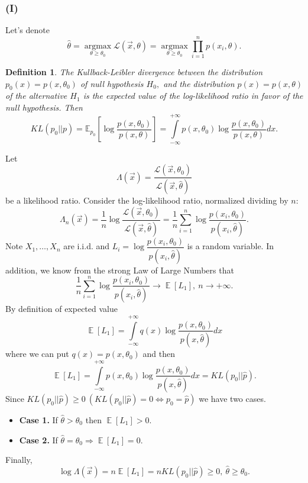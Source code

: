 \documentclass[a4paper, 12pt]{article}
\DeclareMathOperator*{\E}{\mathbb{E}}
\DeclareMathOperator*{\argmax}{\text{argmax}}
\newtheorem{definition}{Definition}
\begin{document}
\subsubsection{(I)}
Let's denote
$$
\hat{\theta} = \argmax \limits_{\theta \geqslant \theta_0} \mathcal{L}(\vec{x}, \theta) = \argmax \limits_{\theta \geqslant \theta_0} \prod \limits_{i=1}^n p(x_i, \theta).
$$
\begin{definition}
The Kullback-Leibler divergence between the  distribution $p_0(x) = p(x, \theta_0)$ of null hypothesis $H_0,$ and the distribution $p(x) = p(x, \theta)$ of the alternative $H_1$ is the expected value of the log-likelihood ratio in favor of the null hypothesis. Then
$$
KL(p_0 || p) = \mathbb{E}_{p_0} \left[ \log \dfrac{p(x, \theta_0)}{p(x, \theta)} \right] = \int \limits_{-\infty}^{+\infty} p(x, \theta_0) \log \dfrac{p(x, \theta_0)}{p(x, \theta)} dx.
$$
\end{definition}
\noindent Let 
\begin{equation}
\label{lab1}
\Lambda(\vec{x}) = \dfrac{\mathcal{L}(\vec{x}, \theta_0)}{\mathcal{L}(\vec{x}, \hat{\theta})}
\end{equation}
be a likelihood ratio.
Consider the log-likelihood ratio, normalized dividing by $n:$
$$
\Lambda_n(\vec{x}) = \dfrac{1}{n} \log \dfrac{\mathcal{L}(\vec{x}, \theta_0)}{\mathcal{L}(\vec{x}, \hat{\theta})} = \dfrac{1}{n} \sum \limits_{i=1}^n \log \dfrac{p(x_i, \theta_0)}{p(x_i, \hat{\theta})}.
$$
Note $X_1, \ldots, X_n$ are i.i.d. and $L_i = \log \dfrac{p(x_i, \theta_0)}{p(x_i, \hat{\theta})}$ is a random variable. In addition, we know from the strong Law of Large Numbers that
$$
\dfrac{1}{n} \sum \limits_{i=1}^n \log \dfrac{p(x_i, \theta_0)}{p(x_i, \hat{\theta})} \rightarrow \E [L_1], ~ n \rightarrow +\infty.
$$ 
By definition of expected value
$$ 
\E [L_1] = \int \limits_{-\infty}^{+\infty} q(x) \log \dfrac{p(x, \theta_0)}{p(x, \hat{\theta})} dx
$$
where we can put $q(x) = p(x, \theta_0)$ and then
$$
\E [L_1] = \int \limits_{-\infty}^{+\infty} p(x, \theta_0) \log \dfrac{p(x, \theta_0)}{p(x, \hat{\theta})} dx = KL(p_0 || \hat{p}).
$$
Since $KL(p_0 || \hat{p}) \geqslant 0 ~ (KL(p_0 || \hat{p}) = 0 \Leftrightarrow p_0 = \hat{p})$ we have two cases.
\begin{itemize}
	\item \textbf{Case 1.} If $\hat{\theta} > \theta_0$ then $\E [L_1] > 0.$
	\item \textbf{Case 2.} If $\hat{\theta} = \theta_0 \Rightarrow \E [L_1] = 0.$
\end{itemize}
Finally, 
$$
\log \Lambda(\vec{x}) = n \E [L_1] = 
n KL(p_0 || \hat{p}) \geqslant 0, ~ \hat{\theta} \geqslant \theta_0.
$$
\end{document}
